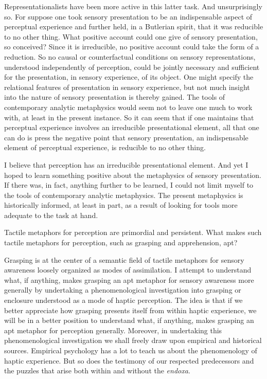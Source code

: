 \documentclass[12pt]{article}
\begin{document}
Representationalists have been more active in this latter task. And unsurprisingly so. For suppose one took sensory presentation to be an indispensable aspect of perceptual experience and further held, in a Butlerian spirit, that it was reducible to no other thing. What positive account could one give of sensory presentation, so conceived? Since it is irreducible, no positive account could take the form of a reduction. So no causal or counterfactual conditions on sensory representations, understood independently of perception, could be jointly necessary and sufficient for the presentation, in sensory experience, of its object. One might specify the
relational features of presentation in sensory experience, but not much insight into the nature of sensory presentation is thereby gained. The tools of contemporary analytic metaphysics would seem not to leave one much to work with, at least in the present instance. So it can seem that if one maintains that perceptual experience involves an irreducible presentational element, all that one can do is press the negative point that sensory presentation, an indispensable element of perceptual experience, is reducible to no other thing.

I believe that perception has an irreducible presentational element. And yet I hoped to learn something positive about the metaphysics of sensory presentation. If there was, in fact, anything further to be learned, I could not limit myself to the tools of contemporary analytic metaphysics. The present metaphysics is historically informed, at least in part, as a result of looking for tools more adequate to the task at hand. 

Tactile metaphors for perception are primordial and persistent. What makes such tactile metaphors for perception, such as grasping and apprehension, apt? 

Grasping is at the center of a semantic field of tactile metaphors for sensory awareness loosely organized as modes of assimilation. I attempt to understand what, if anything, makes grasping an apt metaphor for sensory awareness more generally by undertaking a phenomenological investigation into grasping or enclosure understood as a mode of haptic perception. The idea is that if we better appreciate how grasping presents itself from within haptic experience, we will be in a better position to understand what, if anything, makes grasping an apt metaphor for perception generally. Moreover, in undertaking this phenomenological investigation we shall freely draw upon empirical and historical sources. Empirical psychology has a lot to teach us about the phenomenology of haptic experience. But so does the testimony of our respected predecessors and the puzzles that arise both within and without the \emph{endoxa}.
\end{document}
